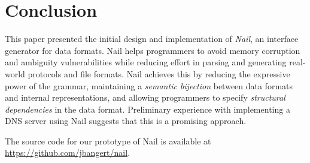 \section{Conclusion}
\label{s:concl}

This paper presented the initial design and implementation of
\textit{Nail}, an interface generator for data formats.  Nail helps
programmers to avoid memory corruption and ambiguity vulnerabilities
while reducing effort in parsing and generating real-world protocols
and file formats.  Nail achieves this by reducing the expressive
power of the grammar, maintaining a \emph{semantic bijection} between
data formats and internal representations, and allowing programmers to
specify \emph{structural dependencies} in the data format.  Preliminary
experience with implementing a DNS server using Nail suggests that this
is a promising approach.

The source code for our prototype of Nail is available at
\url{https://github.com/jbangert/nail}.

